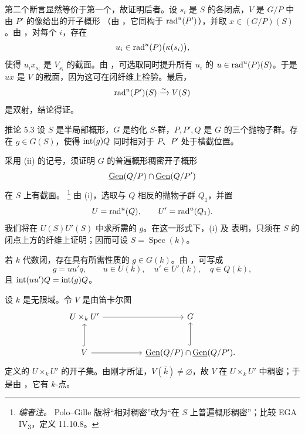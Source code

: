 第二个断言显然等价于第一个，故证明后者。设 \(s_i\) 是 \(S\) 的各闭点，\(V\) 是 \(G/P\) 中由 \(P'\) 的像给出的开子概形 \textup{（由 ，它同构于 \(\operatorname{rad}^u(P')\)）}，并取 \(x\in(G/P)(S)\)。由 ，对每个 \(i\)，存在
\[
 u_i\in\operatorname{rad}^u(P)\bigl(\kappa(s_i)\bigr),
\]
使得 \(u_ix_{s_i}\) 是 \(V_{s_i}\) 的截面。由 ，可选取同时提升所有 \(u_i\) 的 \(u\in\operatorname{rad}^u(P)(S)\)。于是 \(ux\) 是 \(V\) 的截面，因为这可在闭纤维上检验。最后，
\[
 \operatorname{rad}^u(P')(S)\xrightarrow{\sim}V(S)
\]
是双射，结论得证。

\begin{sgastatement}{推论 5.3}
设 \(S\) 是半局部概形，\(G\) 是约化 \(S\)-群，\(P,P',Q\) 是 \(G\) 的三个抛物子群。存在 \(g\in G(S)\)，使得 \(\operatorname{int}(g)Q\) 同时相对于 \(P\)、\(P'\) 处于横截位置。
\end{sgastatement}

采用 \textup{(ii)} 的记号，须证明 \(G\) 的普遍概形稠密开子概形
\[
 \underline{\operatorname{Gen}}(Q/P)\cap\underline{\operatorname{Gen}}(Q/P')
\]
在 \(S\) 上有截面。
\footnote{\emph{编者注。} Polo--Gille 版将“相对稠密”改为“在 \(S\) 上普遍概形稠密”；比较 EGA IV\textsubscript{3}，定义 11.10.8。}
由 \textup{(i)}，选取与 \(Q\) 相反的抛物子群 \(Q_1\)，并置
\[
 U=\operatorname{rad}^u(Q),\qquad U'=\operatorname{rad}^u(Q_1).
\]
我们将在 \(U(S)U'(S)\) 中求所需的 \(g\)。在这一形式下，\textup{(i)} 及  表明，只须在 \(S\) 的闭点上方的纤维上证明；因而可设 \(S=\operatorname{Spec}(k)\)。

若 \(k\) 代数闭，存在具有所需性质的 \(g\in G(k)\)。由 ，可写成
\[
 g=uu'q,\qquad u\in U(k),\quad u'\in U'(k),\quad q\in Q(k),
\]
且 \(\operatorname{int}(uu')Q=\operatorname{int}(g)Q\)。

设 \(k\) 是无限域。令 \(V\) 是由笛卡尔图
\[
\begin{tikzcd}[column sep=huge,row sep=large]
 U\times_kU' \arrow[r] & G\\
 V \arrow[u,hook] \arrow[r]
   & \Gen(Q/P)\cap\Gen(Q/P') \arrow[u,hook].
\end{tikzcd}
\]
定义的 \(U\times_kU'\) 的开子集。由刚才所证，\(V(\bar k)\ne\varnothing\)，故 \(V\) 在 \(U\times_kU'\) 中稠密；于是由 ，它有 \(k\)-点。

